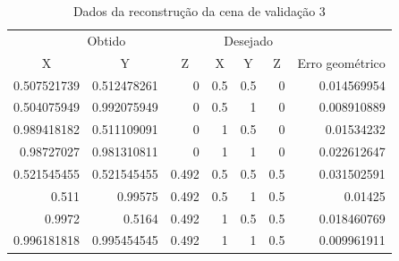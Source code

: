 		\begin{table}
			\caption{Dados da reconstrução da cena de validação 3}
			\label{tabelaErrosCuboReduzido}
			\begin{center}
				\begin{tabular}{r r r | r r r | r}
					\hline
					\multicolumn{3}{c}{Obtido} & \multicolumn{3}{c}{Desejado}\\
					\cline{1-6}
					\multicolumn{1}{c}{X} & \multicolumn{1}{c}{Y} & \multicolumn{1}{c}{Z} & \multicolumn{1}{c}{X} & \multicolumn{1}{c}{Y} & \multicolumn{1}{c}{Z} & \multicolumn{1}{c}{Erro geométrico}\\
					\hline			
					0.507521739		&			0.512478261		&		0				&		0.5			&		0.5			&		0			&		0.014569954\\
					0.504075949		&			0.992075949		&		0				&		0.5			&		1				&		0			&		0.008910889\\
					0.989418182		&			0.511109091		&		0				&		1				&		0.5			&		0			&		0.01534232\\
					0.98727027		& 		0.981310811		&		0				&		1				&		1				&		0			&		0.022612647\\
					0.521545455		&			0.521545455		&		0.492		&		0.5			&		0.5			&		0.5		&		0.031502591\\
					0.511					&			0.99575				&		0.492		&		0.5			&		1				&		0.5		&		0.01425\\
					0.9972 				&			0.5164				&		0.492		&		1				&		0.5			&		0.5		&		0.018460769\\
					0.996181818		&			0.995454545		&		0.492		&		1				&		1				&		0.5		&		0.009961911\\
					\hline	
				\end{tabular}
			\end{center}
		\end{table}	
		

